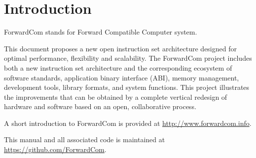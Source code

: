 \documentclass[forwardcom.tex]{subfiles}
\begin{document}
\RaggedRight

\chapter{Introduction}
ForwardCom stands for Forward Compatible Computer system.
\vspace{2mm}

This document proposes a new open instruction set architecture designed for optimal performance, flexibility and scalability. The ForwardCom project includes both a new instruction set architecture and the corresponding ecosystem of software standards, application binary interface (ABI), memory management, development tools, library formats, and system functions. This project illustrates the improvements that can be obtained by a complete vertical redesign of hardware and software based on an open, collaborative process.
\vspace{2mm}

A short introduction to ForwardCom is provided at 
\href{http://www.forwardcom.info}{http://www.forwardcom.info}.
\vspace{2mm}

This manual and all associated code is maintained at 
\href{https://github.com/ForwardCom/}{https://github.com/ForwardCom}.

 
\end{document}
